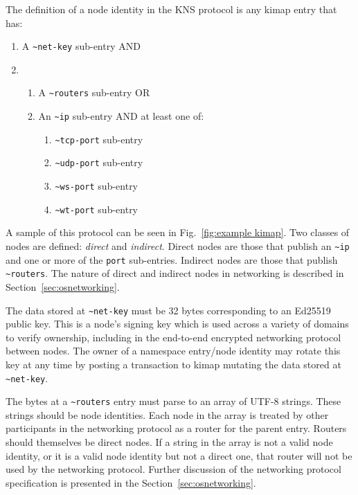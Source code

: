 \documentclass[runningheads]{llncs}
\begin{document}
The definition of a node identity in the KNS protocol is any kimap entry that has:

\begin{enumerate}
    \item A \verb|~net-key| sub-entry AND
    \item \begin{enumerate}
        \item A \verb|~routers| sub-entry OR
        \item An \verb|~ip| sub-entry AND at least one of:
            \begin{enumerate}
                \item \verb|~tcp-port| sub-entry
                \item \verb|~udp-port| sub-entry
                \item \verb|~ws-port| sub-entry
                \item \verb|~wt-port| sub-entry
            \end{enumerate}
        \end{enumerate}
\end{enumerate}

A sample of this protocol can be seen in Fig.~\ref{fig:example kimap}.
Two classes of nodes are defined: \textit{direct} and \textit{indirect}.
Direct nodes are those that publish an \verb|~ip| and one or more of the \verb|port| sub-entries.
Indirect nodes are those that publish \verb|~routers|.
The nature of direct and indirect nodes in networking is described in Section~\ref{sec:osnetworking}.

The data stored at \verb|~net-key| must be 32 bytes corresponding to an Ed25519 public key.
This is a node's signing key which is used across a variety of domains to verify ownership, including in the end-to-end encrypted networking protocol between nodes.
The owner of a namespace entry/node identity may rotate this key at any time by posting a transaction to kimap mutating the data stored at \verb|~net-key|.

The bytes at a \verb|~routers| entry must parse to an array of UTF-8 strings.
These strings should be node identities.
Each node in the array is treated by other participants in the networking protocol as a router for the parent entry.
Routers should themselves be direct nodes.
If a string in the array is not a valid node identity, or it is a valid node identity but not a direct one, that router will not be used by the networking protocol.
Further discussion of the networking protocol specification is presented in the Section~\ref{sec:osnetworking}.
\end{document}

